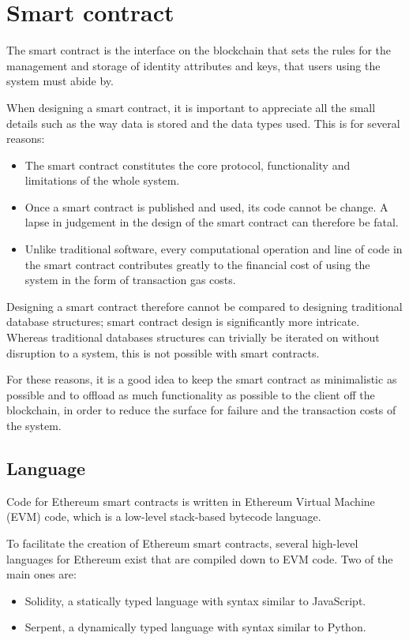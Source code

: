 \documentclass[12pt,a4paper]{report}
\begin{document}
	\section{Smart contract}
	The smart contract is the interface on the blockchain that sets the rules for the management and storage of identity attributes and keys, that users using the system must abide by.
	
	When designing a smart contract, it is important to appreciate all the small details such as the way data is stored and the data types used. This is for several reasons:
	\begin{itemize}
		\item The smart contract constitutes the core protocol, functionality and limitations of the whole system.
		\item Once a smart contract is published and used, its code cannot be change. A lapse in judgement in the design of the smart contract can therefore be fatal.
		\item Unlike traditional software, every computational operation and line of code in the smart contract contributes greatly to the financial cost of using the system in the form of transaction gas costs.\cite{3}
	\end{itemize}
	Designing a smart contract therefore cannot be compared to designing traditional database structures; smart contract design is significantly more intricate. Whereas traditional databases structures can trivially be iterated on without disruption to a system, this is not possible with smart contracts.
	
	For these reasons, it is a good idea to keep the smart contract as minimalistic as possible and to offload as much functionality as possible to the client off the blockchain, in order to reduce the surface for failure and the transaction costs of the system.
	
	\subsection{Language}
	Code for Ethereum smart contracts is written in Ethereum Virtual Machine (EVM) code, which is a low-level stack-based bytecode language.\cite{3}
	
	To facilitate the creation of Ethereum smart contracts, several high-level languages for Ethereum exist that are compiled down to EVM code. Two of the main ones are:
	\begin{itemize}
		\item Solidity, a statically typed language with syntax similar to JavaScript.\cite{11}
		\item Serpent, a dynamically typed language with syntax similar to Python.\cite{12}
	\end{itemize}
	
\end{document}
